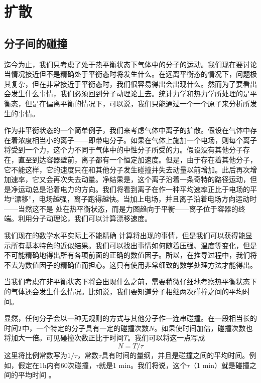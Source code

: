 \chapter{扩散}

\section{分子间的碰撞}

迄今为止，我们只考虑了处于热平衡状态下气体中的分子的运动。我们现在要讨论当情况接近但不是精确处于平衡态时将发生什么。在远离平衡态的情况下，问题极其复杂，但在非常接近于平衡态时，我们很容易得出会出现什么。然而为了要看出会发生什么事情，我们必须回到分子动理论上去。统计力学和热力学所处理的是平衡态，但是在偏离平衡的情况下，可以说，我们只能通过一个一个原子来分析所发生的事情。

作为非平衡状态的一个简单例子，我们来考虑气体中离子的扩散。假设在气体中存在着浓度相当小的离子——即带电分子。如果在气体上施加一个电场，则每个离子将受到一个力，这个力不同于气体中的中性分子所受的力。假设没有其他分子存在，直至到达容器壁前，离子都有一个恒定加速度。但是，由于存在着其他分子，它不能这样，它的速度只在和其他分子发生碰撞并失去动量以前增加。此后再次增加速率，它又会再次失去动量。净结果是，这个离子沿着一条奇特的路径运动，但是净运动总是沿着电力的方向。我们将看到离子在作一种平均速率正比于电场的平均“漂移”，电场越强，离子跑得越快。当加上电场，并且离子沿着电场方向运动时——当然这不是 处在热平衡状态，而是力图趋向于平衡——离子位于容器的终端。利用分子动理论，我们可以计算漂移速度。

我们现在的数学水平实际上不能精确 计算将出现的事情，但是我们可以获得能显示所有基本特色的近似结果。我们可以找出事情如何随着压强、温度等变化，但是不可能精确地得出所有各项前面的正确的数值因子。所以，在推导过程中，我们将不去为数值因子的精确值而担心。这只有使用非常细致的数学处理方法才能得出。

当我们考虑在非平衡状态下将会出现什么之前，需要稍微仔细地考察热平衡状态下的气体还会发生什么情况。比如说，我们要知道分子相继两次碰撞之间的平均时间。

显然，任何分子会以一种无规则的方式与其他分子作一连串碰撞。在一段相当长的时间$T$中，一个特定的分子具有一定的碰撞次数$N$。如果使时间加倍，碰撞次数也将加大一倍。可见碰撞次数正比于时间$T$。我们可以将这一点写成
\begin{equation}
    \label{Eq:I:43:1}
    N=T/\tau
\end{equation}
这里将比例常数写为$1/\tau$，常数$\tau$具有时间的量纲，并且是碰撞之间的平均时间。例如，假定在1h内有60次碰撞，$\tau$就是1 min。我们将说，这个$\tau$（1 min）就是碰撞之间的平均时间 。

